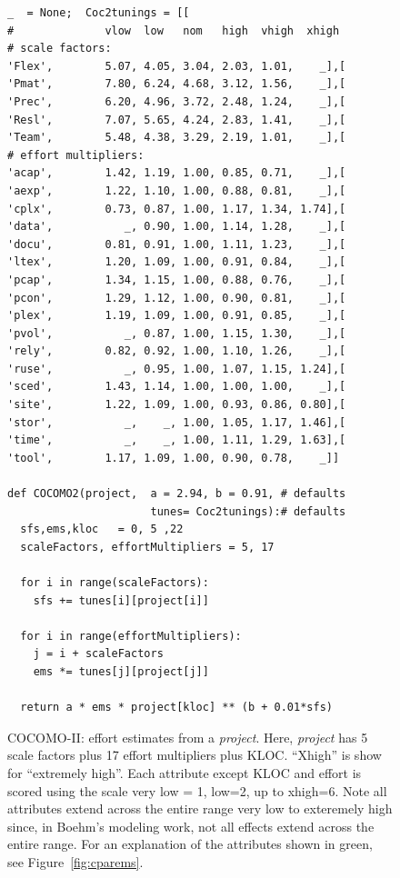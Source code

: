 \documentclass[smallcondesed]{svjour3}
\newcommand{\fig}[1]{Figure~\ref{fig:#1}}
\begin{document}
\begin{figure}[!t]
\begin{center}
\begin{lstlisting}
_  = None;  Coc2tunings = [[
#              vlow  low   nom   high  vhigh  xhigh   
# scale factors:
'Flex',        5.07, 4.05, 3.04, 2.03, 1.01,    _],[
'Pmat',        7.80, 6.24, 4.68, 3.12, 1.56,    _],[
'Prec',        6.20, 4.96, 3.72, 2.48, 1.24,    _],[
'Resl',        7.07, 5.65, 4.24, 2.83, 1.41,    _],[
'Team',        5.48, 4.38, 3.29, 2.19, 1.01,    _],[
# effort multipliers:        
'acap',        1.42, 1.19, 1.00, 0.85, 0.71,    _],[
'aexp',        1.22, 1.10, 1.00, 0.88, 0.81,    _],[
'cplx',        0.73, 0.87, 1.00, 1.17, 1.34, 1.74],[
'data',           _, 0.90, 1.00, 1.14, 1.28,    _],[
'docu',        0.81, 0.91, 1.00, 1.11, 1.23,    _],[
'ltex',        1.20, 1.09, 1.00, 0.91, 0.84,    _],[
'pcap',        1.34, 1.15, 1.00, 0.88, 0.76,    _],[ 
'pcon',        1.29, 1.12, 1.00, 0.90, 0.81,    _],[
'plex',        1.19, 1.09, 1.00, 0.91, 0.85,    _],[ 
'pvol',           _, 0.87, 1.00, 1.15, 1.30,    _],[
'rely',        0.82, 0.92, 1.00, 1.10, 1.26,    _],[
'ruse',           _, 0.95, 1.00, 1.07, 1.15, 1.24],[
'sced',        1.43, 1.14, 1.00, 1.00, 1.00,    _],[ 
'site',        1.22, 1.09, 1.00, 0.93, 0.86, 0.80],[ 
'stor',           _,    _, 1.00, 1.05, 1.17, 1.46],[
'time',           _,    _, 1.00, 1.11, 1.29, 1.63],[
'tool',        1.17, 1.09, 1.00, 0.90, 0.78,    _]]

def COCOMO2(project,  a = 2.94, b = 0.91, # defaults
                      tunes= Coc2tunings):# defaults 
  sfs,ems,kloc   = 0, 5 ,22        
  scaleFactors, effortMultipliers = 5, 17
  
  for i in range(scaleFactors):
    sfs += tunes[i][project[i]]
    
  for i in range(effortMultipliers):
    j = i + scaleFactors
    ems *= tunes[j][project[j]] 
    
  return a * ems * project[kloc] ** (b + 0.01*sfs) 
\end{lstlisting}
\end{center}
\caption{COCOMO-II: effort estimates from a {\em project}.
Here, {\em project} has  5 scale
factors plus 17 effort multipliers plus KLOC. 
``Xhigh'' is show for ``extremely high''.
Each attribute except KLOC and effort is scored
using the scale very low = 1, low=2, up to
xhigh=6.
Note all attributes extend across the entire
range very low to exteremely high since,
in Boehm's modeling work, not all effects extend
across the entire range.
For an explanation of the attributes shown in
green, see \fig{cparems}.}\label{fig:coc2}
\end{figure}
\end{document}
